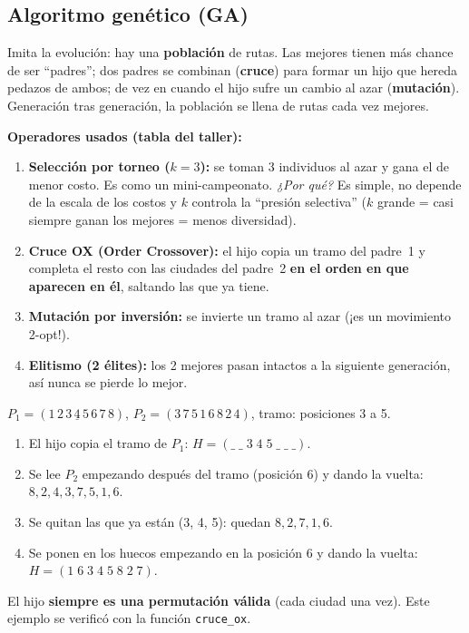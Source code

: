 \documentclass[11pt,a4paper]{article}
\begin{document}
\subsection{Algoritmo genético (GA)}
\begin{idea}
Imita la evolución: hay una \textbf{población} de rutas. Las mejores tienen más chance de ser ``padres''; dos padres se combinan
(\textbf{cruce}) para formar un hijo que hereda pedazos de ambos; de vez en cuando el hijo sufre un cambio al azar (\textbf{mutación}).
Generación tras generación, la población se llena de rutas cada vez mejores.
\end{idea}

\textbf{Operadores usados (tabla del taller):}
\begin{enumerate}
\item \textbf{Selección por torneo ($k=3$):} se toman 3 individuos al azar y gana el de menor costo. Es como un mini-campeonato.
  \emph{¿Por qué?} Es simple, no depende de la escala de los costos y $k$ controla la ``presión selectiva''
  ($k$ grande = casi siempre ganan los mejores = menos diversidad).
\item \textbf{Cruce OX (Order Crossover):} el hijo copia un tramo del padre~1 y completa el resto con las ciudades del padre~2
  \textbf{en el orden en que aparecen en él}, saltando las que ya tiene.
\item \textbf{Mutación por inversión:} se invierte un tramo al azar (¡es un movimiento 2-opt!).
\item \textbf{Elitismo (2 élites):} los 2 mejores pasan intactos a la siguiente generación, así nunca se pierde lo mejor.
\end{enumerate}

\begin{mate}
$P_1=(1\,2\,\underline{3\,4\,5}\,6\,7\,8)$, \quad $P_2=(3\,7\,5\,1\,6\,8\,2\,4)$, tramo: posiciones 3 a 5.
\begin{enumerate}
\item El hijo copia el tramo de $P_1$: $H=(\_\;\_\;3\;4\;5\;\_\;\_\;\_)$.
\item Se lee $P_2$ empezando después del tramo (posición 6) y dando la vuelta: $8,2,4,3,7,5,1,6$.
\item Se quitan las que ya están (3, 4, 5): quedan $8,2,7,1,6$.
\item Se ponen en los huecos empezando en la posición 6 y dando la vuelta: $H=(1\;6\;3\;4\;5\;8\;2\;7)$.
\end{enumerate}
El hijo \textbf{siempre es una permutación válida} (cada ciudad una vez). Este ejemplo se verificó con la función \texttt{cruce\_ox}.
\end{mate}
\end{document}
